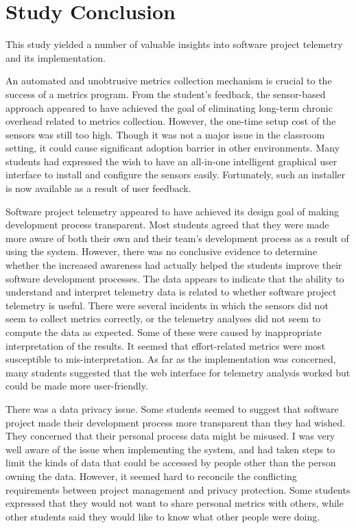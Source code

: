 \clearpage
\section{Study Conclusion}  \label{EvaluationInClassroom:Conclusion}

This study yielded a number of valuable insights into software project telemetry and its implementation.

An automated and unobtrusive metrics collection mechanism is crucial to the success of a metrics program. From the student's feedback, the sensor-based approach appeared to have achieved the goal of eliminating long-term chronic overhead related to metrics collection. However, the one-time setup cost of the sensors was still too high. Though it was not a major issue in the classroom setting, it could cause significant adoption barrier in other environments. Many students had expressed the wish to have an all-in-one intelligent graphical user interface to install and configure the sensors easily. Fortunately, such an installer is now available as a result of user feedback.
	
Software project telemetry appeared to have achieved its design goal of making development process transparent. Most students agreed that they were made more aware of both their own and their team's development process as a result of using the system. However, there was no conclusive evidence to determine whether the increased awareness had actually helped the students improve their software development processes. The data appears to indicate that the ability to understand and interpret telemetry data is related to whether software project telemetry is useful. There were several incidents in which the sensors did not seem to collect metrics correctly, or the telemetry analyses did not seem to compute the data as expected. Some of these were caused by inappropriate interpretation of the results. It seemed that effort-related metrics were most susceptible to mis-interpretation. As far as the implementation was concerned, many students suggested that the web interface for telemetry analysis worked but could be made more user-friendly. 		
	
There was a data privacy issue. Some students seemed to suggest that software project made their development process more transparent than they had wished. They concerned that their personal process data might be misused. I was very well aware of the issue when implementing the system, and had taken steps to limit the kinds of data that could be accessed by people other than the person owning the data. However, it seemed hard to reconcile the conflicting requirements between project management and privacy protection. Some students expressed that they would not want to share personal metrics with others, while other students said they would like to know what other people were doing.

	
